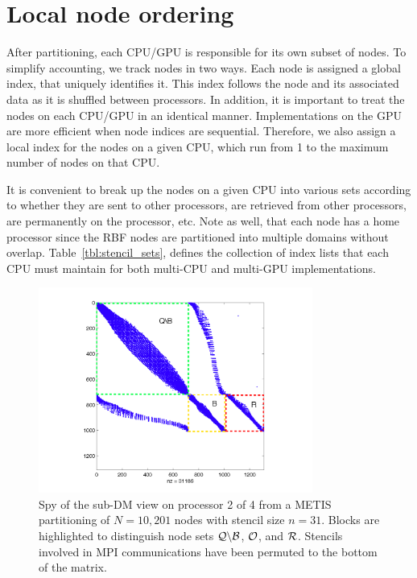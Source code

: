 \documentclass{report}
\begin{document}
\section{Local node ordering}

After partitioning, each CPU/GPU is responsible for its own subset of nodes. 
To simplify accounting, we track nodes in two ways. Each node is assigned
a global index, that uniquely identifies it. This index follows the node 
and its associated data as it is shuffled between processors. In addition, 
it is important to treat the nodes on each CPU/GPU in an identical manner. 
Implementations on the GPU are more efficient when node indices
are sequential. Therefore, we also assign a local index for the nodes on 
a given CPU, which run from 1 to the maximum number of nodes on that CPU. 

It is convenient to break up the nodes on a given CPU into various sets
according to whether they are sent to other processors, are retrieved from 
other processors, are permanently on the processor, etc. Note as well, 
that each node has a home processor since the RBF nodes are partitioned into 
multiple domains without overlap.
Table~\ref{tbl:stencil_sets}, defines the collection of index lists that each CPU must maintain for both multi-CPU and multi-GPU implementations.  


\begin{figure}[ht!]
\begin{center}
\includegraphics[width=9cm]{rbffd_methods_content/decompositions/spy_metis_stencil_example_labels.png}
\caption{Spy of the sub-DM view on processor 2 of 4 from a METIS partitioning of $N=10,201$ nodes with stencil size $n=31$. Blocks are highlighted to distinguish node sets $\mathcal{Q} \backslash \mathcal{B}$, $\mathcal{O}$, and $\mathcal{R}$. Stencils involved in MPI communications have been permuted to the bottom of the matrix.}
\label{fig:decomp_spy}
\end{center}
\end{figure}
\end{document}
